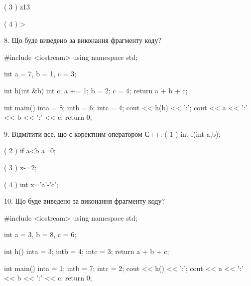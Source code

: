 \documentclass[11pt, ukrainian]{article}
\begin{document}
\begin{large}
( 3 ) z13

( 4 ) >


8. Що буде виведено за виконання фрагменту коду?

#include <iostream>
using namespace std;

int a = 7, b = 1, c = 3;

int h(int &b){
int c;    a += 1;
    b = 2;
    c = 4;
    return a + b + c;
}

int main(){
    inta = 8;
    intb = 6;
    intc = 4;
    cout << h(b) << ':';
    cout << a << ':' << b << ':' << c;
    return 0; 
}


9. Відмітити все, що є коректним оператором С++:
( 1 ) int f(int a,b);

( 2 ) if a<b a=0;

( 3 ) x-=2;

( 4 ) int x='a'-'c';


10. Що буде виведено за виконання фрагменту коду?

#include <iostream>
using namespace std;

int a = 3, b = 8, c = 6;

int h(){
    inta = 3;
    intb = 4;
    intc = 3;
    return a + b + c;
}

int main(){
    inta = 1;
    intb = 7;
    intc = 2;
    cout << h() << ':';
    cout << a << ':' << b << ':' << c;
    return 0;
}

\end{large}
\newpage
\end{document}
